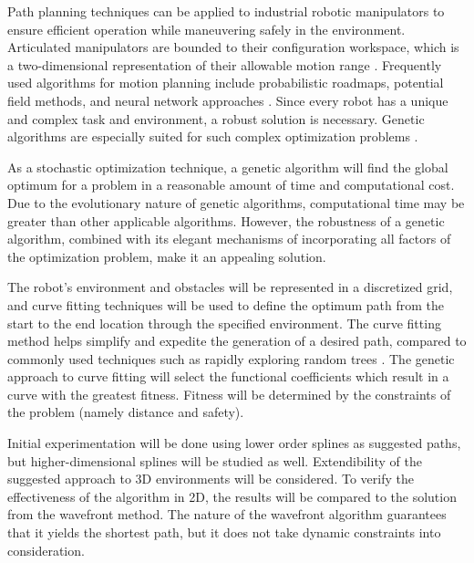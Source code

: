 \documentclass[twoside,letter,10pt]{article}
\begin{document}
\begin{multicols}{2}
Path planning techniques can be applied to industrial robotic manipulators to ensure efficient operation while maneuvering safely in the environment. Articulated manipulators are bounded to their configuration workspace, which is a two-dimensional representation of their allowable motion range \cite{kavraki96}. Frequently used algorithms for motion planning include probabilistic roadmaps, potential field methods, and neural network approaches \cite{sharir89,khosla88,rimon92,yang00}. Since every robot has a unique and complex task and environment, a robust solution is necessary. Genetic algorithms are especially suited for such complex optimization problems \cite{renner03}.

As a stochastic optimization technique, a genetic algorithm will find the global optimum for a problem in a reasonable amount of time and computational cost. Due to the evolutionary nature of genetic algorithms, computational time may be greater than other applicable algorithms. However, the robustness of a genetic algorithm, combined with its elegant mechanisms of incorporating all factors of the optimization problem, make it an appealing solution.

The robot's environment and obstacles will be represented in a discretized grid, and curve fitting techniques will be used to define the optimum path from the start to the end location through the specified environment. The curve fitting method helps simplify and expedite the generation of a desired path, compared to commonly used techniques such as rapidly exploring random trees \cite{rodriguez06}. The genetic approach to curve fitting will select the functional coefficients which result in a curve with the greatest fitness. Fitness will be determined by the constraints of the problem (namely distance and safety).

Initial experimentation will be done using lower order splines as suggested paths, but higher-dimensional splines will be studied as well. Extendibility of the suggested approach to 3D environments will be considered. To verify the effectiveness of the algorithm in 2D, the results will be compared to the solution from the wavefront method. The nature of the wavefront algorithm guarantees that it yields the shortest path, but it does not take dynamic constraints into consideration.



\end{multicols}
\end{document}
